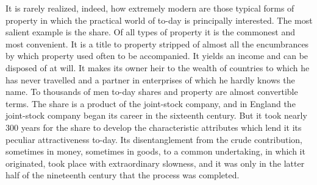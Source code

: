 \documentclass{book}
\begin{document}
It is rarely realized, indeed, how extremely modern are those typical forms of property in which the practical world of to-day is principally interested. The most salient example is the share. Of all types of property it is the commonest and most convenient. It is a title to property stripped of almost all the encumbrances by which property used often to be accompanied. It yields an income and can be disposed of at will. It makes its owner heir to the wealth of countries to which he has never travelled and a partner in enterprises of which he hardly knows the name. To thousands of men to-day shares and property are almost convertible terms. The share is a product of the joint-stock company, and in England the joint-stock company began its career in the sixteenth century. But it took nearly 300 years for the share to develop the characteristic attributes which lend it its peculiar attractiveness to-day. Its disentanglement from the crude contribution, sometimes in money, sometimes in goods, to a common undertaking, in which it originated, took place with extraordinary slowness, and it was only in the latter half of the nineteenth century that the process was completed.
\end{document}
